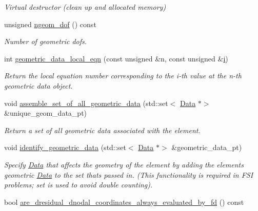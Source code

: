 \begin{DoxyCompactItemize}
\begin{DoxyCompactList}\small\item\em Virtual destructor (clean up and allocated memory) \end{DoxyCompactList}\item 
unsigned \hyperlink{classoomph_1_1ElementWithMovingNodes_a14f1abd33151ddaa8705b23d93d57037}{ngeom\+\_\+dof} () const
\begin{DoxyCompactList}\small\item\em Number of geometric dofs. \end{DoxyCompactList}\item 
int \hyperlink{classoomph_1_1ElementWithMovingNodes_a2005bd9a0f38ad2eab3ec1250c8a7ba4}{geometric\+\_\+data\+\_\+local\+\_\+eqn} (const unsigned \&n, const unsigned \&\hyperlink{cfortran_8h_adb50e893b86b3e55e751a42eab3cba82}{i})
\begin{DoxyCompactList}\small\item\em Return the local equation number corresponding to the i-\/th value at the n-\/th geometric data object. \end{DoxyCompactList}\item 
void \hyperlink{classoomph_1_1ElementWithMovingNodes_a9f483615124c0a4ce4be88c5c19190f5}{assemble\+\_\+set\+\_\+of\+\_\+all\+\_\+geometric\+\_\+data} (std\+::set$<$ \hyperlink{classoomph_1_1Data}{Data} $\ast$$>$ \&unique\+\_\+geom\+\_\+data\+\_\+pt)
\begin{DoxyCompactList}\small\item\em Return a set of all geometric data associated with the element. \end{DoxyCompactList}\item 
void \hyperlink{classoomph_1_1ElementWithMovingNodes_ab19e7a475828f119dd97772bb42a63a4}{identify\+\_\+geometric\+\_\+data} (std\+::set$<$ \hyperlink{classoomph_1_1Data}{Data} $\ast$$>$ \&geometric\+\_\+data\+\_\+pt)
\begin{DoxyCompactList}\small\item\em Specify \hyperlink{classoomph_1_1Data}{Data} that affects the geometry of the element by adding the element\textquotesingle{}s geometric \hyperlink{classoomph_1_1Data}{Data} to the set that\textquotesingle{}s passed in. (This functionality is required in F\+SI problems; set is used to avoid double counting). \end{DoxyCompactList}\item 
bool \hyperlink{classoomph_1_1ElementWithMovingNodes_a372374d0b2541faca710bcd7705db058}{are\+\_\+dresidual\+\_\+dnodal\+\_\+coordinates\+\_\+always\+\_\+evaluated\+\_\+by\+\_\+fd} () const

\end{DoxyCompactItemize}
